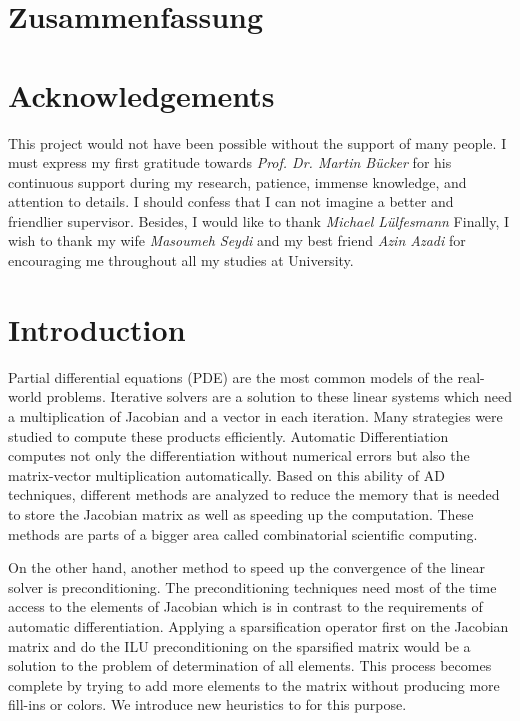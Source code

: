 \documentclass[12pt, twoside]{book}
\begin{document}
\chapter*{Zusammenfassung}
\chapter*{Acknowledgements}
\noindent This project would not have been possible without
the support of many people. I must express my first gratitude
towards \textit{Prof. Dr. Martin B\"ucker} for his continuous
support during my research, patience, immense knowledge,
and attention to details.
I should confess that I can not imagine a better and friendlier supervisor.
Besides, I would like to thank \textit{Michael Lülfesmann}
Finally, I wish to thank my wife \textit{Masoumeh Seydi} and
my best friend \textit{Azin Azadi} for encouraging me throughout all my studies at University.

\tableofcontents
\chapter{Introduction}
Partial differential equations (PDE) are the most common models of the real-world problems. Iterative solvers are a solution to these linear systems which need a multiplication of Jacobian and a vector in each iteration.
Many strategies were studied to compute these products efficiently.
Automatic Differentiation~\cite{Griewank2008EDP,Rall1981ADT} computes not only the differentiation without numerical errors but also the matrix-vector multiplication automatically.
Based on this ability of AD techniques, different methods are analyzed to reduce the memory that is needed to store the Jacobian matrix as well as speeding up the computation. These methods are parts of a bigger area called combinatorial scientific computing.

On the other hand, another method to speed up the convergence of the linear solver
is preconditioning. The preconditioning techniques need most of the time access to
the elements of Jacobian which is in contrast to the requirements of automatic differentiation.
Applying a sparsification operator first on the Jacobian matrix and do the ILU preconditioning
on the sparsified matrix would be a solution to the problem of determination of
all elements. This process becomes complete by trying to add more elements to the matrix
without producing more fill-ins or colors. We introduce new heuristics to for this purpose.
\end{document}
